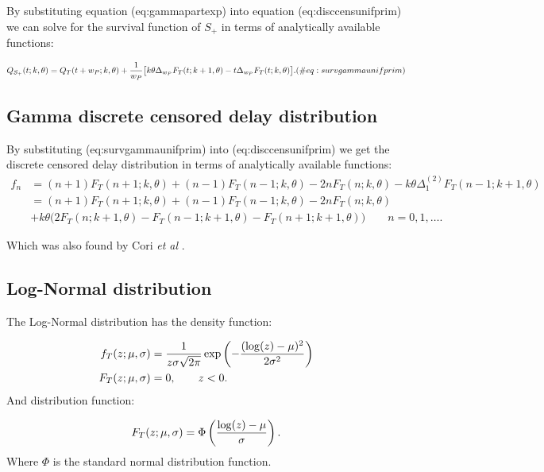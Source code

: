 \documentclass[10pt,letterpaper]{article}
\begin{document}
By substituting equation \@ref(eq:gammapartexp) into equation \@ref(eq:disccensunifprim) we can solve for the survival function of $S_+$ in terms of analytically available functions:

\begin{equation}
Q_{S_+}(t; k, \theta) = Q_T(t + w_P; k, \theta) + { 1 \over w_P} \big[ k \theta \Delta_{w_P}F_T(t; k+1, \theta) - t \Delta_{w_P}F_T(t; k, \theta) \big].
(\#eq:survgammaunifprim)
\end{equation}

\subsection{Gamma discrete censored delay distribution}

By substituting \@ref(eq:survgammaunifprim) into \@ref(eq:disccensunifprim) we get the discrete censored delay distribution in terms of analytically available functions:
\begin{equation}
\begin{aligned}
f_n &= (n+1) F_T(n+1; k, \theta) + (n-1) F_T(n-1; k, \theta) - 2  n F_T(n; k, \theta) - k \theta \Delta_1^{(2)}F_T(n-1; k+1, \theta)\\
 &= (n+1) F_T(n+1; k, \theta) + (n-1) F_T(n-1; k, \theta) - 2  n F_T(n; k, \theta) \\
 &+ k \theta \Big( 2 F_T(n; k+1, \theta) - F_T(n-1; k+1, \theta) - F_T(n+1; k+1,\theta)  \Big) \qquad n = 0, 1, \dots.
\end{aligned}
\end{equation}

Which was also found by Cori \textit{et al} \cite{Cori2013}.

\subsection{Log-Normal distribution}

The Log-Normal distribution has the density function:

\begin{equation}
\begin{aligned}
f_T(z;\mu, \sigma) &= {1 \over z \sigma \sqrt{2\pi}} \exp\left( - {(\log(z) - \mu)^2 \over 2 \sigma^2} \right)\\
F_T(z;\mu, \sigma) &= 0, \qquad z < 0.
\end{aligned}
\end{equation}
And distribution function:

\begin{equation}
F_T(z;\mu, \sigma) = \Phi\left( {\log(z) - \mu \over \sigma} \right).
\end{equation}
Where $\Phi$ is the standard normal distribution function.
\end{document}
